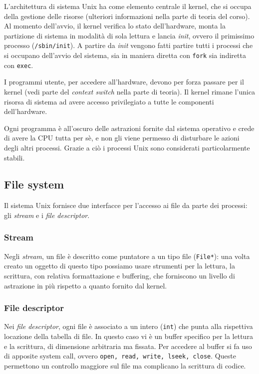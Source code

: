 \documentclass[11pt]{article}
\begin{document}
L'architettura di sistema Unix ha come elemento centrale il kernel, che si occupa della gestione delle risorse (ulteriori informazioni nella parte di teoria del corso). Al momento dell'avvio, il kernel verifica lo stato dell'hardware, monta la partizione di sistema in modalità di sola lettura e lancia \textit{init}, ovvero il primissimo processo (\verb|/sbin/init|). A partire da \textit{init} vengono fatti partire tutti i processi che si occupano dell'avvio del sistema, sia in maniera diretta con \verb|fork| sia indiretta con \verb|exec|.

I programmi utente, per accedere all'hardware, devono per forza passare per il kernel (vedi parte del \textit{context switch} nella parte di teoria). Il kernel rimane l'unica risorsa di sistema ad avere accesso privilegiato a tutte le componenti dell'hardware.

Ogni programma è all'oscuro delle astrazioni fornite dal sistema operativo e crede di avere la CPU tutta per sè, e non gli viene permesso di disturbare le azioni degli altri processi. Grazie a ciò i processi Unix sono considerati particolarmente stabili.

\subsection{File system}

Il sistema Unix fornisce due interfacce per l'accesso ai file da parte dei processi: gli \textit{stream} e i \textit{file descriptor}. 

\subsubsection{Stream}

Negli \textit{stream}, un file è descritto come puntatore a un tipo file (\verb|File*|): una volta creato un oggetto di questo tipo possiamo usare strumenti per la lettura, la scrittura, con relativa formattazione e buffering, che forniscono un livello di astrazione in più rispetto a quanto fornito dal kernel.

\subsubsection{File descriptor}

Nei \textit{file descriptor}, ogni file è associato a un intero (\verb|int|) che punta alla rispettiva locazione della tabella di file. In questo caso vi è un buffer specifico per la lettura e la scrittura, di dimensione arbitraria ma fissata. Per accedere al buffer si fa uso di apposite system call, ovvero \verb|open, read, write, lseek, close|. Queste permettono un controllo maggiore sul file ma complicano la scrittura di codice. 
\end{document}
